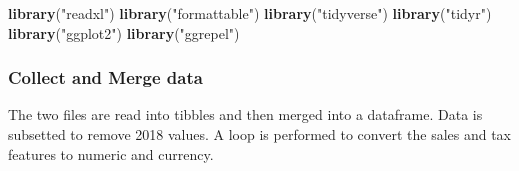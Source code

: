 \documentclass[]{article}
\newenvironment{Shaded}{\begin{snugshade}}{\end{snugshade}}
\newcommand{\KeywordTok}[1]{\textcolor[rgb]{0.13,0.29,0.53}{\textbf{#1}}}
\newcommand{\NormalTok}[1]{#1}
\newcommand{\StringTok}[1]{\textcolor[rgb]{0.31,0.60,0.02}{#1}}
\begin{document}
\begin{Shaded}
\begin{Highlighting}[]
\KeywordTok{library}\NormalTok{(}\StringTok{"readxl"}\NormalTok{)}
\KeywordTok{library}\NormalTok{(}\StringTok{"formattable"}\NormalTok{)}
\KeywordTok{library}\NormalTok{(}\StringTok{"tidyverse"}\NormalTok{)}
\KeywordTok{library}\NormalTok{(}\StringTok{"tidyr"}\NormalTok{)}
\KeywordTok{library}\NormalTok{(}\StringTok{"ggplot2"}\NormalTok{)}
\KeywordTok{library}\NormalTok{(}\StringTok{"ggrepel"}\NormalTok{)}
\end{Highlighting}
\end{Shaded}

\hypertarget{collect-and-merge-data}{%
\subsubsection{Collect and Merge data}\label{collect-and-merge-data}}

The two files are read into tibbles and then merged into a dataframe.
Data is subsetted to remove 2018 values. A loop is performed to convert
the sales and tax features to numeric and currency.
\end{document}
